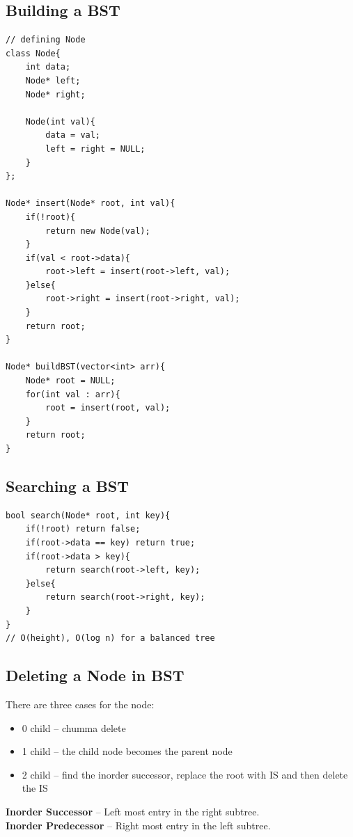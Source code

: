 \documentclass[11pt]{article}
\begin{document}
\subsection{Building a BST}
\begin{minipage}{\linewidth}
\begin{lstlisting}
// defining Node
class Node{
	int data;
	Node* left;
	Node* right;

	Node(int val){
		data = val;
		left = right = NULL;
	}
};

Node* insert(Node* root, int val){
	if(!root){
		return new Node(val);
	}
	if(val < root->data){
		root->left = insert(root->left, val);
	}else{
		root->right = insert(root->right, val);
	}
	return root;
}

Node* buildBST(vector<int> arr){
	Node* root = NULL;
	for(int val : arr){
		root = insert(root, val);
	}
	return root;
}
\end{lstlisting}
\end{minipage}

\subsection{Searching a BST}
\begin{minipage}{\linewidth}
\begin{lstlisting}
bool search(Node* root, int key){
	if(!root) return false;
	if(root->data == key) return true;
	if(root->data > key){
		return search(root->left, key);
	}else{
		return search(root->right, key);
	}
}
// O(height), O(log n) for a balanced tree
\end{lstlisting}
\end{minipage}

\subsection{Deleting a Node in BST}
There are three cases for the node:
\begin{itemize}
    \item 0 child -- chumma delete
    \item 1 child -- the child node becomes the parent node
    \item 2 child -- find the inorder successor, replace the root with IS and then delete the IS
\end{itemize}
\textbf{Inorder Successor} -- Left most entry in the right subtree. \\
\textbf{Inorder Predecessor} -- Right most entry in the left subtree.
\end{document}
